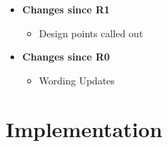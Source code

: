 \documentclass[a4paper,10pt,oneside,openany,final,article]{memoir}
\begin{document}
\begin{itemize}
\item \textbf{Changes since R1}
  \begin{itemize}
  \item Design points called out
  \end{itemize}
\item \textbf{Changes since R0}
  \begin{itemize}
  \item Wording Updates
  \end{itemize}
\end{itemize}

\renewcommand{\bibname}{References}




\backmatter
\chapter*{Implementation}
\end{document}
